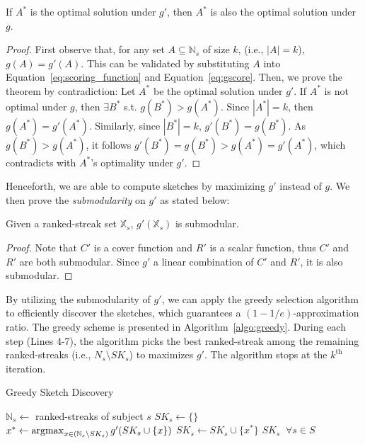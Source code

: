 \begin{theorem}
If $A^*$ is the optimal solution under $g'$, then $A^*$ is
also the optimal solution under $g$.
\end{theorem}
\begin{proof}
First observe that, for any set $A \subseteq \mathbb{N}_s$ of size $k$, (i.e., $|A|=k$),
$g(A) = g'(A)$. This can be validated by substituting $A$ into Equation~\ref{eq:scoring_function} and Equation~\ref{eq:gscore}. Then,
we prove the theorem by contradiction: 
Let $A^*$ be the optimal solution under $g'$.  If $A^*$ is not optimal under $g$, then $\exists B^*$ s.t. $g(B^*) > g(A^*)$. Since $|A^*| = k$, then $g(A^*) = g'(A^*)$. Similarly,
since $|B^*|=k$, $g'(B^*)=g(B^*)$. As $g(B^*) > g(A^*)$, it follows $g'(B^*)=g(B^*)>g(A^*)= g'(A^*)$, which
contradicts with $A^*$'s optimality under $g'$.
\end{proof}

Henceforth, we are able to compute sketches by maximizing $g'$ instead of $g$. 
We then prove the \emph{submodularity} on $g'$ as stated below:
\begin{theorem}
\label{thm:submodular}
Given a ranked-streak set $\mathbb{X}_s$,
$g'(\mathbb{X}_s)$ is submodular.
\end{theorem}
\begin{proof}
Note that $C'$ is a cover function and $R'$ 
is a scalar function, thus $C'$ and $R'$ are both submodular.
Since $g'$ a linear combination of $C'$ and $R'$,
it is also submodular.
\end{proof}

By utilizing the submodularity of $g'$, we can apply the greedy selection algorithm \cite{Fisher1978An} 
to efficiently discover the sketches,
which guarantees a $(1-1/e)$-approximation ratio. 
The greedy scheme is presented in Algorithm~\ref{algo:greedy}. During each step (Lines 4-7), 
the algorithm picks the best ranked-streak among the remaining ranked-streaks (i.e., $N_s \setminus SK_s$) to maximizes $g'$.
The algorithm stops at the $k^{\text{th}}$ iteration.

\begin{algorithm}[h]
\caption{Greedy Sketch Discovery}
\label{algo:greedy}
\begin{algorithmic}[1]
\State $\mathbb{N}_s \gets$ ranked-streaks of subject $s$
\State $SK_s \gets \{\}$
	\State $x^* \gets \operatorname*{argmax}_{x\in (\mathbb{N}_s \setminus SK_s)}g'(SK_s\cup \{x\})$ \label{code:greedy}
	\State $SK_s \gets SK_s \cup \{x^*\}$
\EndFor
\EndFor
\State \Return $SK_s \;\; \forall s \in S$
\end{algorithmic}
\end{algorithm}

